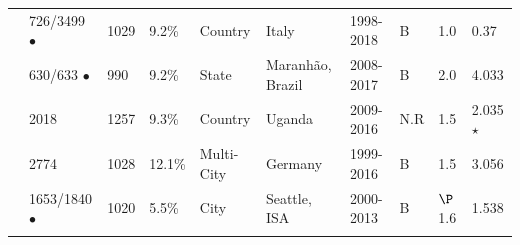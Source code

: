 \documentclass[utf8]{FrontiersinHarvard} %
\begin{document}
\begin{table}[h!]
\begin{ssmall}
\begin{tabular}{llllllllll}
			\cite{Fabeni:2020aa}        & 726/3499 $\bullet$  & 1029 & 9.2\%  & Country    & Italy                    & 1998-2018 & B                     & 1.0                                        & 0.37           \\
			\cite{Leal:2020aa}          & 630/633 $\bullet$   & 990  & 9.2\%  & State      & Maranhão, Brazil         & 2008-2017 & B                     & 2.0                                        & 4.033          \\
			\cite{bbosa_short_2020}     & 2018                & 1257 & 9.3\%  & Country    & Uganda                   & 2009-2016 & N.R                   & 1.5                                        & 2.035 $\star$  \\
			\cite{Stecher:2018aa}       & 2774                & 1028 & 12.1\% & Multi-City & Germany                  & 1999-2016 & B                     & 1.5                                        & 3.056          \\
			\cite{chato_public_2020}    & 1653/1840 $\bullet$ & 1020 & 5.5\%  & City       & Seattle, ISA             & 2000-2013 & B                     & $\P$1.6                                    & 1.538          \\
			\\

			\hline
		\end{tabular}
	\end{ssmall}
\end{table}
\end{document}
